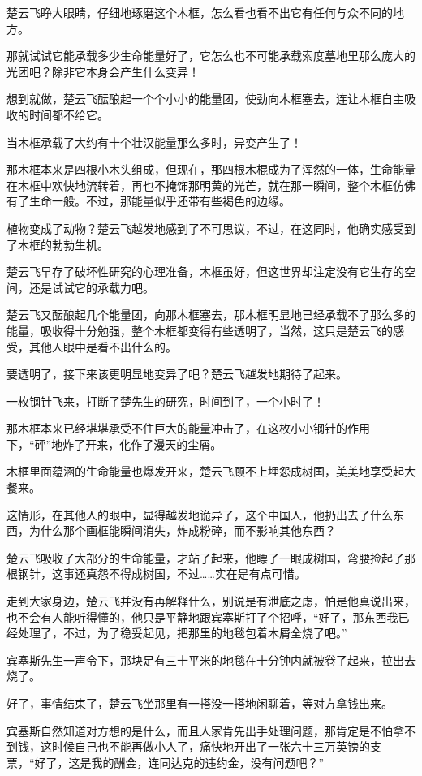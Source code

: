 楚云飞睁大眼睛，仔细地琢磨这个木框，怎么看也看不出它有任何与众不同的地方。

那就试试它能承载多少生命能量好了，它怎么也不可能承载索度墓地里那么庞大的光团吧？除非它本身会产生什么变异！

想到就做，楚云飞酝酿起一个个小小的能量团，使劲向木框塞去，连让木框自主吸收的时间都不给它。

当木框承载了大约有十个壮汉能量那么多时，异变产生了！

那木框本来是四根小木头组成，但现在，那四根木棍成为了浑然的一体，生命能量在木框中欢快地流转着，再也不掩饰那明黄的光芒，就在那一瞬间，整个木框仿佛有了生命一般。不过，那能量似乎还带有些褐色的边缘。

植物变成了动物？楚云飞越发地感到了不可思议，不过，在这同时，他确实感受到了木框的勃勃生机。

楚云飞早存了破坏性研究的心理准备，木框虽好，但这世界却注定没有它生存的空间，还是试试它的承载力吧。

楚云飞又酝酿起几个能量团，向那木框塞去，那木框明显地已经承载不了那么多的能量，吸收得十分勉强，整个木框都变得有些透明了，当然，这只是楚云飞的感受，其他人眼中是看不出什么的。

要透明了，接下来该更明显地变异了吧？楚云飞越发地期待了起来。

一枚钢针飞来，打断了楚先生的研究，时间到了，一个小时了！

那木框本来已经堪堪承受不住巨大的能量冲击了，在这枚小小钢针的作用下，“砰”地炸了开来，化作了漫天的尘屑。

木框里面蕴涵的生命能量也爆发开来，楚云飞顾不上埋怨成树国，美美地享受起大餐来。

这情形，在其他人的眼中，显得越发地诡异了，这个中国人，他扔出去了什么东西，为什么那个画框能瞬间消失，炸成粉碎，而不影响其他东西？

楚云飞吸收了大部分的生命能量，才站了起来，他瞟了一眼成树国，弯腰捡起了那根钢针，这事还真怨不得成树国，不过……实在是有点可惜。

走到大家身边，楚云飞并没有再解释什么，别说是有泄底之虑，怕是他真说出来，也不会有人能听得懂的，他只是平静地跟宾塞斯打了个招呼，“好了，那东西我已经处理了，不过，为了稳妥起见，把那里的地毯包着木屑全烧了吧。”

宾塞斯先生一声令下，那块足有三十平米的地毯在十分钟内就被卷了起来，拉出去烧了。

好了，事情结束了，楚云飞坐那里有一搭没一搭地闲聊着，等对方拿钱出来。

宾塞斯自然知道对方想的是什么，而且人家肯先出手处理问题，那肯定是不怕拿不到钱，这时候自己也不能再做小人了，痛快地开出了一张六十三万英镑的支票，“好了，这是我的酬金，连同达克的违约金，没有问题吧？”

